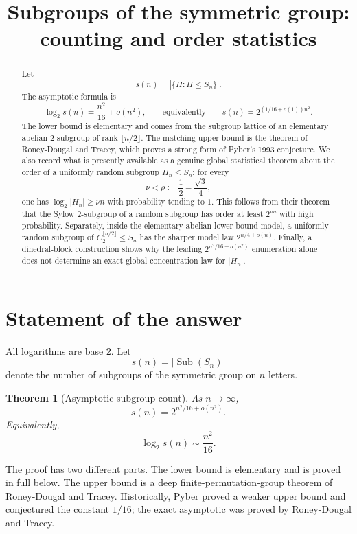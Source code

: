 \documentclass[a4paper,11pt]{amsart}
\title[Subgroups of the symmetric group]{Subgroups of the symmetric group: counting and order statistics}
\author{}
\date{}
\newtheorem{theorem}{Theorem}[section]
\theoremstyle{remark}
\newcommand{\Sub}{\operatorname{Sub}}
\begin{document}
\begin{abstract}
Let
\[
        s(n)=|\{H:H\leq S_n\}|.
\]
The asymptotic formula is
\[
        \log_2 s(n)=\frac{n^2}{16}+o(n^2),
        \qquad\text{equivalently}\qquad
        s(n)=2^{(1/16+o(1))n^2}.
\]
The lower bound is elementary and comes from the subgroup lattice of an elementary abelian
2-subgroup of rank \(\lfloor n/2\rfloor\). The matching upper bound is the theorem of
Roney-Dougal and Tracey, which proves a strong form of Pyber's 1993 conjecture. We also record
what is presently available as a genuine global statistical theorem about the order of a uniformly
random subgroup \(H_n\leq S_n\): for every
\[
        \nu<\rho:=\frac12-\frac{\sqrt3}{4},
\]
one has \(\log_2 |H_n|\geq \nu n\) with probability tending to \(1\). This follows from their theorem
that the Sylow \(2\)-subgroup of a random subgroup has order at least \(2^{\nu n}\) with high
probability. Separately, inside the elementary abelian lower-bound model, a uniformly random
subgroup of \(C_2^{\lfloor n/2\rfloor}\leq S_n\) has the sharper model law
\(2^{n/4+o(n)}\). Finally, a dihedral-block construction shows why the leading
\(2^{n^2/16+o(n^2)}\) enumeration alone does not determine an exact global concentration law for
\(|H_n|\).
\end{abstract}

\maketitle

\section{Statement of the answer}

All logarithms are base \(2\). Let
\[
        s(n)=|\Sub(S_n)|
\]
denote the number of subgroups of the symmetric group on \(n\) letters.

\begin{theorem}[Asymptotic subgroup count]\label{thm:main}
As \(n\to\infty\),
\[
        s(n)=2^{n^2/16+o(n^2)}.
\]
Equivalently,
\[
        \log_2 s(n)\sim \frac{n^2}{16}.
\]
\end{theorem}

The proof has two different parts. The lower bound is elementary and is proved in full below. The
upper bound is a deep finite-permutation-group theorem of Roney-Dougal and Tracey. Historically,
Pyber proved a weaker upper bound and conjectured the constant \(1/16\); the exact asymptotic
was proved by Roney-Dougal and Tracey.
\end{document}
